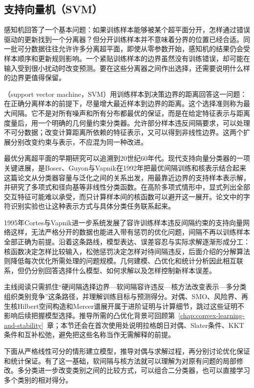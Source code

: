 \subsection{支持向量机（SVM）}
\label{sec:classification-svm}

感知机回答了一个基本问题：如果训练样本能够被某个超平面分开，怎样通过错误驱动的更新找到一个分离器？但分开训练样本并不意味着分界的位置已经合适。同一批可分数据往往允许许多分离超平面，即使从零参数开始，感知机的结果仍会受样本顺序和更新规则影响。一个紧贴训练样本的边界虽然没有训练错误，却可能在输入受到很小扰动时改变预测。要在这些分离器之间作出选择，还需要说明什么样的边界更值得保留。

（support vector machine，SVM）用训练样本到决策边界的距离回答这一问题：在正确分离样本的前提下，尽量增大最近样本到边界的距离。这个选择准则称为最大间隔。它不是对所有噪声和所有分布都最优的保证，而是在给定特征表示与距离度量后，用一个明确的几何量约束分类器。允许部分样本违反间隔要求，可以处理不可分数据；改变计算距离所依赖的特征表示，又可以得到非线性边界。这两个扩展分别改变约束与表示，不应混为同一种改进。

最优分离超平面的早期研究可以追溯到20世纪60年代。现代支持向量分类器的一项关键进展，是Boser、Guyon与Vapnik在1992年把最优间隔训练和核表示结合起来这篇论文从分类器容量与泛化之间的关系出发，用最靠近边界的支持样本表示解，并研究了多项式和径向基等非线性分类函数。在高阶多项式情形中，显式列出全部交互特征可能难以承受，而只计算样本间的核函数可以避开这一展开。论文中的字符识别实验也让这种表示方式与具体分类任务联系起来。

1995年Cortes与Vapnik进一步系统发展了容许训练样本违反间隔约束的支持向量网络这样，无法严格分开的数据也能进入带有惩罚的优化问题，间隔不再以训练样本全部正确为前提。沿着这条路线，模型表达、误差容忍与实际求解逐渐形成分工：核函数决定怎样比较输入，松弛惩罚决定怎样对待间隔违反，后面介绍的分解算法则降低每次优化所需处理的问题规模。几何建模、凸优化和统计分析因此相互联系，但仍分别回答选择什么模型、如何求解以及怎样控制新样本误差。

主线阅读只需抓住“硬间隔选择边界—软间隔容许违反—核方法改变表示—多分类组织类别竞争”这条路径，并理解训练目标与预测得分。对偶、SMO、风险界、再生核Hilbert空间构造和Mercer谱展开属于进阶证明与计算细节，跳过这些证明不影响后续把握模型选择。推导所需的凸优化背景可回顾第~\ref{chap:convex-learning-and-stability}~章；本节还会在首次使用处说明拉格朗日对偶、Slater条件、KKT条件和互补松弛，避免把这些名称当作无需解释的前提。

下面从严格线性可分的情形建立模型，推导对偶与求解过程，再分别讨论优化保证和统计保证。有了这一基础，软间隔与核方法就可以理解为对原有问题的局部修改。多分类进一步改变类别之间的比较方式，可以组合二分类器，也可以直接学习多个类别的相对得分。

